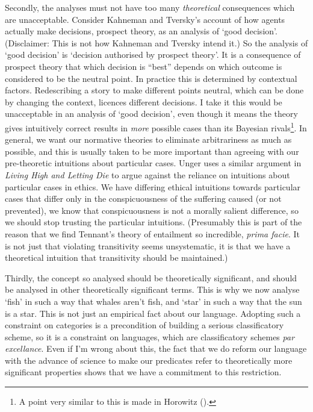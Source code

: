\documentclass[
  11pt,
  letterpaper,
  DIV=11,
  numbers=noendperiod,
  twoside]{scrartcl}
\begin{document}
Secondly, the analyses must not have too many \emph{theoretical}
consequences which are unacceptable. Consider Kahneman and Tversky's
account of how agents actually make decisions, prospect theory, as an
analysis of `good decision'. (Disclaimer: This is not how Kahneman and
Tversky intend it.) So the analysis of `good decision' is `decision
authorised by prospect theory'. It is a consequence of prospect theory
that which decision is ``best'' depends on which outcome is considered
to be the neutral point. In practice this is determined by contextual
factors. Redescribing a story to make different points neutral, which
can be done by changing the context, licences different decisions. I
take it this would be unacceptable in an analysis of `good decision',
even though it means the theory gives intuitively correct results in
\emph{more} possible cases than its Bayesian rivals\footnote{A point
  very similar to this is made in Horowitz
  ().}. In general, we want our
normative theories to eliminate arbitrariness as much as possible, and
this is usually taken to be more important than agreeing with our
pre-theoretic intuitions about particular cases. Unger uses a similar
argument in \emph{Living High and Letting Die} to argue against the
reliance on intuitions about particular cases in ethics. We have
differing ethical intuitions towards particular cases that differ only
in the conspicuousness of the suffering caused (or not prevented), we
know that conspicuousness is not a morally salient difference, so we
should stop trusting the particular intuitions. (Presumably this is part
of the reason that we find Tennant's theory of entailment so incredible,
\emph{prima facie}. It is not just that violating transitivity seems
unsystematic, it is that we have a theoretical intuition that
transitivity should be maintained.)

Thirdly, the concept so analysed should be theoretically significant,
and should be analysed in other theoretically significant terms. This is
why we now analyse `fish' in such a way that whales aren't fish, and
`star' in such a way that the sun is a star. This is not just an
empirical fact about our language. Adopting such a constraint on
categories is a precondition of building a serious classificatory
scheme, so it is a constraint on languages, which are classificatory
schemes \emph{par excellance}. Even if I'm wrong about this, the fact
that we do reform our language with the advance of science to make our
predicates refer to theoretically more significant properties shows that
we have a commitment to this restriction.
\end{document}
